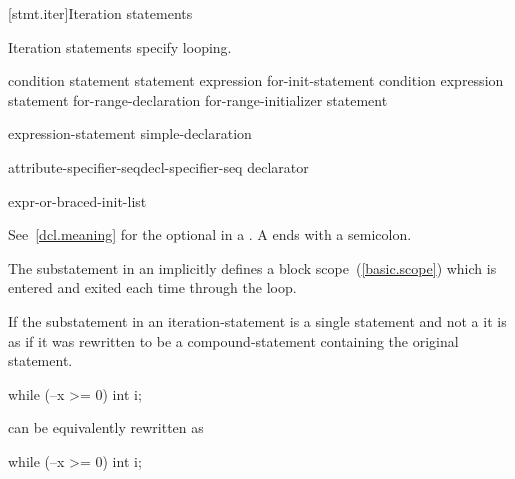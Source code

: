 [stmt.iter]{Iteration statements}%

\pnum
Iteration statements specify looping.

%
%
%
%
\begin{bnf}
\br
     condition \terminal{)} statement\br
     statement  expression \terminal{) ;}\br
     for-init-statement condition\opt \terminal{;} expression\opt \terminal{)} statement\br
     for-range-declaration \terminal{:} for-range-initializer \terminal{)} statement
\end{bnf}

\begin{bnf}
\br
    expression-statement\br
    simple-declaration
\end{bnf}

\begin{bnf}
\br
    attribute-specifier-seq\opt decl-specifier-seq declarator
\end{bnf}

\begin{bnf}
\br
    expr-or-braced-init-list\br
\end{bnf}

See~\ref{dcl.meaning} for the optional  in a
.
\enternote
A  ends with a semicolon.
\exitnote

\pnum
The substatement in an  implicitly defines
a block scope~(\ref{basic.scope}) which is entered and exited each time
through the loop.

%
If the substatement in an iteration-statement is a single statement and
not a  it is as if it was rewritten to be
a compound-statement containing the original statement.
\enterexample

\begin{codeblock}
while (--x >= 0)
  int i;
\end{codeblock}

can be equivalently rewritten as

\begin{codeblock}
while (--x >= 0) {
  int i;
}
\end{codeblock}

